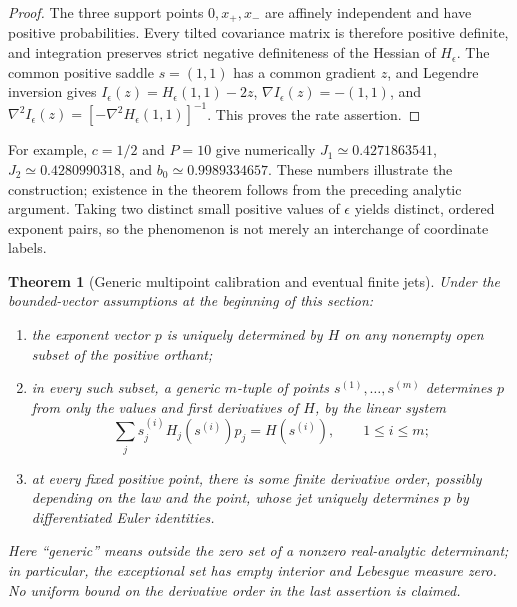 \documentclass[11pt,letterpaper]{article}
\newtheorem{theorem}{Theorem}[section]
\theoremstyle{definition}
\theoremstyle{remark}
\newcommand{\1}{\mathbf 1}
\begin{document}
\begin{proof}
The three support points $0,x_+,x_-$ are affinely independent and
have positive probabilities.  Every tilted covariance matrix is
therefore positive definite, and integration preserves strict
negative definiteness of the Hessian of $H_\epsilon$.  The common
positive saddle $s=(1,1)$ has a common gradient $z$, and Legendre
inversion gives
$I_\epsilon(z)=H_\epsilon(1,1)-2z$,
$\nabla I_\epsilon(z)=-(1,1)$, and
$\nabla^2I_\epsilon(z)=[-\nabla^2H_\epsilon(1,1)]^{-1}$.
This proves the rate assertion.
\end{proof}

For example, $c=1/2$ and $P=10$ give numerically
$J_1\simeq0.4271863541$, $J_2\simeq0.4280990318$, and
$b_0\simeq0.9989334657$.  These numbers illustrate the construction;
existence in the theorem follows from the preceding analytic argument.
Taking two distinct small positive values of $\epsilon$ yields
distinct, ordered exponent pairs, so the phenomenon is not merely an
interchange of coordinate labels.

\begin{theorem}[Generic multipoint calibration and eventual finite jets]
\label{p07:thm:correlated-multipoint-calibration}
Under the bounded-vector assumptions at the beginning of this section:
\begin{enumerate}
\item the exponent vector $p$ is uniquely determined by $H$ on any
nonempty open subset of the positive orthant;
\item in every such subset, a generic $m$-tuple of points
$s^{(1)},\ldots,s^{(m)}$ determines $p$ from only the values and first
derivatives of $H$, by the linear system
\begin{equation}\label{p07:eq:multipoint-calibration}
 \sum_j s_j^{(i)}H_j(s^{(i)})p_j=H(s^{(i)}),
 \qquad 1\le i\le m;
\end{equation}
\item at every fixed positive point, there is some finite derivative
order, possibly depending on the law and the point, whose jet
uniquely determines $p$ by differentiated Euler identities.
\end{enumerate}
Here ``generic'' means outside the zero set of a nonzero real-analytic
determinant; in particular, the exceptional set has empty interior
and Lebesgue measure zero.  No uniform bound on the derivative order
in the last assertion is claimed.
\end{theorem}
\end{document}
